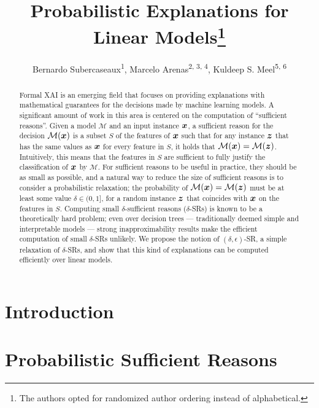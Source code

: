\documentclass[letterpaper]{article} %
\title{Probabilistic Explanations for Linear Models\thanks{
		The authors
    opted for randomized author ordering  
    instead of alphabetical.}}
\author {
  Bernardo Subercaseaux\textsuperscript{\rm 1}, 
  Marcelo Arenas\textsuperscript{\rm 2, 3, 4},  
  Kuldeep S. Meel\textsuperscript{\rm 5, \rm 6}
}
\newcommand{\M}{\mathcal{M}}
\begin{document}
\maketitle

\begin{abstract}
  Formal XAI is an emerging field that focuses on providing explanations with mathematical guarantees for the decisions made by machine learning models. A significant amount of work in this area is centered on the computation of ``sufficient reasons''. 
  Given a model $\M$ and an input instance ${\bm{x}}$, a sufficient reason for the decision $\M(\vx)$ is a subset $S$ of the features of ${\bm{x}}$ such that for any instance ${\bm{z}}$ that has the same values as ${\bm{x}}$ for every feature in $S$, it holds that $\M(\vx) = \M(\vz)$. 
  Intuitively, this means that the features in $S$ are sufficient to fully justify the classification of ${\bm{x}}$ by $\M$.
  For sufficient reasons to be useful in practice, they should be as small as possible, and a natural way to reduce the size of sufficient reasons is to consider a probabilistic relaxation; the probability of $\M(\vx) = \M(\vz)$ must
  be at least some value $\delta \in (0,1]$, for a random instance ${\bm{z}}$ that coincides with ${\bm{x}}$ on the features in $S$.  Computing small $\delta$-sufficient reasons ($\delta$-SRs) is known to be a theoretically hard problem; even over decision trees — traditionally deemed simple and interpretable models — strong inapproximability results make the efficient computation of small $\delta$-SRs unlikely.
  We propose the notion of $(\delta, \epsilon)$-SR, a simple relaxation of $\delta$-SRs, and show that this kind of explanations can be computed efficiently over linear models. 
\end{abstract}

\begin{links}
\end{links}

\section{Introduction}
\label{sec-into}


\section{Probabilistic Sufficient Reasons}
\label{sec-prop-SR}

\end{document}
